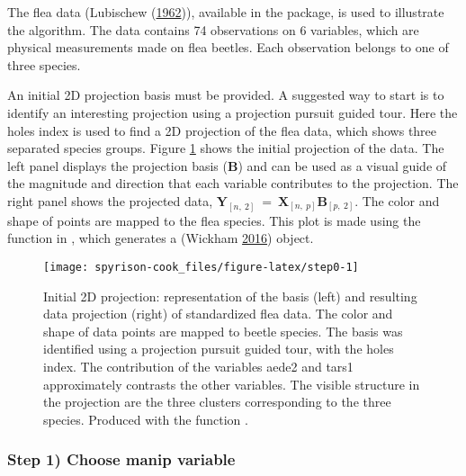 The flea data (Lubischew
(\protect\hyperlink{ref-lubischew_use_1962}{1962})), available in the
 package, is used to illustrate the algorithm. The data
contains 74 observations on 6 variables, which are physical measurements
made on flea beetles. Each observation belongs to one of three species.

An initial 2D projection basis must be provided. A suggested way to
start is to identify an interesting projection using a projection
pursuit guided tour. Here the holes index is used to find a 2D
projection of the flea data, which shows three separated species groups.
Figure \ref{fig:step0} shows the initial projection of the data. The
left panel displays the projection basis (\(\textbf{B}\)) and can be
used as a visual guide of the magnitude and direction that each variable
contributes to the projection. The right panel shows the projected data,
\(\textbf{Y}_{[n,~2]} ~=~ \textbf{X}_{[n,~p]} \textbf{B}_{[p,~2]}\). The
color and shape of points are mapped to the flea species. This plot is
made using the  function in , which
generates a  (Wickham
\protect\hyperlink{ref-wickham_ggplot2:_2016}{2016}) object.

\begin{Schunk}
\begin{figure}

{\centering \texttt{[image: spyrison-cook\_files/figure-latex/step0-1]} 

}

\caption[Initial 2D projection]{Initial 2D projection: representation of the basis  (left) and resulting data projection (right) of standardized flea data. The color and shape of data points are mapped to beetle species. The basis was identified using a projection pursuit guided tour, with the holes index. The contribution of the variables aede2 and tars1 approximately contrasts the other variables. The visible structure in the projection are the three clusters corresponding to the three species. Produced with the function .}\label{fig:step0}
\end{figure}
\end{Schunk}

\hypertarget{step-1-choose-manip-variable}{%
\subsubsection{Step 1) Choose manip
variable}\label{step-1-choose-manip-variable}}

